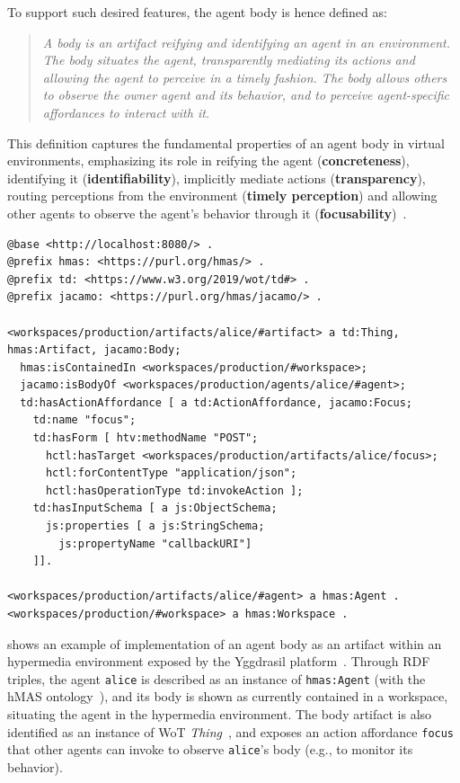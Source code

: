 To support such desired features, the agent body is hence defined as:
\begin{quote}
\emph{
A body is an artifact reifying and identifying an agent in an environment. The body situates the agent, transparently mediating its actions and allowing the agent to perceive in a timely fashion.
The body allows others to observe the owner agent and its behavior, and to perceive agent-specific affordances to interact with it.
}
\end{quote}

This definition captures the fundamental properties of an agent body in virtual environments, emphasizing its role in reifying the agent (\textbf{concreteness}), identifying it (\textbf{identifiability}), implicitly mediate actions (\textbf{transparency}), routing perceptions from the environment (\textbf{timely perception}) and allowing other agents to observe the agent's behavior through it (\textbf{focusability})~\cite{embodiment2025}.

\begin{code}
\label{lst:agent-description}
\begin{verbatim}
@base <http://localhost:8080/> .
@prefix hmas: <https://purl.org/hmas/> .
@prefix td: <https://www.w3.org/2019/wot/td#> .
@prefix jacamo: <https://purl.org/hmas/jacamo/> .

<workspaces/production/artifacts/alice/#artifact> a td:Thing, hmas:Artifact, jacamo:Body;
  hmas:isContainedIn <workspaces/production/#workspace>;
  jacamo:isBodyOf <workspaces/production/agents/alice/#agent>;
  td:hasActionAffordance [ a td:ActionAffordance, jacamo:Focus;
    td:name "focus";
    td:hasForm [ htv:methodName "POST";
      hctl:hasTarget <workspaces/production/artifacts/alice/focus>;
      hctl:forContentType "application/json";
      hctl:hasOperationType td:invokeAction ];
    td:hasInputSchema [ a js:ObjectSchema;
      js:properties [ a js:StringSchema;
        js:propertyName "callbackURI"]
    ]].

<workspaces/production/artifacts/alice/#agent> a hmas:Agent .
<workspaces/production/#workspace> a hmas:Workspace .
\end{verbatim}
\end{code}

 shows an example of implementation of an agent body as an artifact within an hypermedia environment exposed by the Yggdrasil platform~\cite{Ciortea_Boissier_Ricci_2019}.
%
Through \ac{RDF} triples, the agent \texttt{alice} is described as an instance of \texttt{hmas:Agent} (with the \ac{hMAS} ontology~\cite{hmas-core}), and its body is shown as currently contained in a workspace, situating the agent in the hypermedia environment.
%
The body artifact is also identified as an instance of \ac{WoT} \emph{Thing}~\cite{wot-td}, and exposes an action affordance \texttt{focus} that other agents can invoke to observe \texttt{alice}'s body (e.g., to monitor its behavior).

